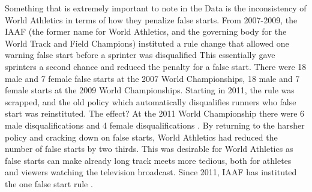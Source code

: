 \documentclass[12pt, letterpaper, titlepage]{article}
\begin{document}
Something that is extremely important to note in the Data is the inconsistency of World Athletics 
in terms of how they penalize false starts.  From 2007-2009, the IAAF (the former name for World 
Athletics, and the governing body for the World Track and Field Champions) instituted a rule change
that allowed one warning false start before a sprinter was disqualified \citep{False-Start}  This 
essentially gave sprinters a second chance and reduced the penalty for a false start.  There were 
18 male and 7 female false starts at the 2007 World Championships, 18 male and 7 female starts at 
the 2009 World Championships. Starting in 2011, the rule was scrapped, and the old policy which 
automatically disqualifies runners who false start was reinstituted.  The effect? At the 2011 World
Championship there were 6 male disqualifications and 4 female disqualifications \citep{False-Start}. 
By returning to the harsher policy and cracking down on false starts, World Athletics had reduced the
number of false starts by two thirds. This was desirable for World Athletics as false starts can 
make already long track meets more tedious, both for athletes and viewers watching the 
television broadcast.  Since 2011, IAAF has instituted the one false start rule
\citep{Pilianidis}.
\end{document}
